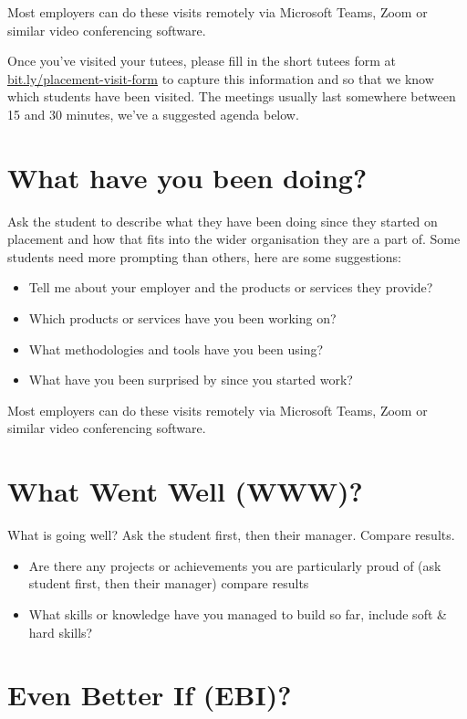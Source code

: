 \documentclass[
]{book}
\providecommand{\tightlist}{%
  \setlength{\itemsep}{0pt}\setlength{\parskip}{0pt}}
\begin{document}
Most employers can do these visits remotely via Microsoft Teams, Zoom or similar video conferencing software.

Once you've visited your tutees, please fill in the short tutees form at \url{bit.ly/placement-visit-form} \citep{visitform} to capture this information and so that we know which students have been visited. The meetings usually last somewhere between 15 and 30 minutes, we've a suggested agenda below.

\section{What have you been doing?}\label{what}

Ask the student to describe what they have been doing since they started on placement and how that fits into the wider organisation they are a part of. Some students need more prompting than others, here are some suggestions:

\begin{itemize}
\tightlist
\item
  Tell me about your employer and the products or services they provide?
\item
  Which products or services have you been working on?
\item
  What methodologies and tools have you been using?
\item
  What have you been surprised by since you started work?
\end{itemize}

Most employers can do these visits remotely via Microsoft Teams, Zoom or similar video conferencing software.

\section{What Went Well (WWW)?}\label{www}

What is going well? Ask the student first, then their manager. Compare results.

\begin{itemize}
\tightlist
\item
  Are there any projects or achievements you are particularly proud of (ask student first, then their manager) compare results
\item
  What skills or knowledge have you managed to build so far, include soft \& hard skills?
\end{itemize}

\section{Even Better If (EBI)?}\label{ebi}
\end{document}

